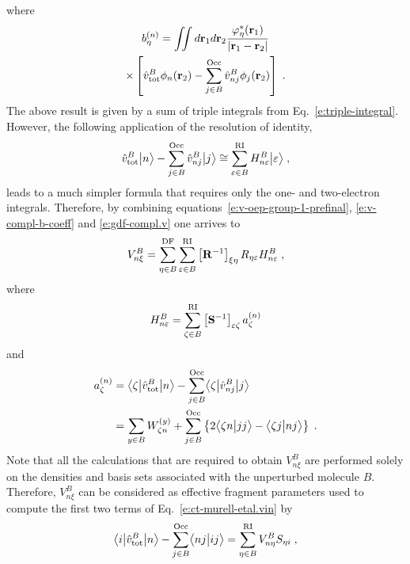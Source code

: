 %
where
%
\begin{multline}
 b^{(n)}_\eta = \iint 
           d{\bf r}_1 d{\bf r}_2  
           \frac{ \varphi^*_\eta({\bf r}_1) }
            {\vert {\bf r}_1 - {\bf r}_2 \vert } \\ \times
          \left[ 
           \hat{v}^B_{\rm tot}  \phi_n({\bf r}_2) 
         - \sum_{j\in B}^{\rm Occ} \hat{v}^B_{nj} \phi_j({{\bf r}_2})
           \right]  \;.
\end{multline}
%
The above result is given by a sum of triple integrals from Eq.~\eqref{e:triple-integral}.
However, the following application of the resolution of identity,
%
\begin{equation}
 \hat{v}^B_{\rm tot} \Ket{n} - \sum_{j\in B}^{\rm Occ} \hat{v}^B_{nj} \Ket{j}
 \cong \sum_{\varepsilon\in B}^{\rm RI} H_{n\varepsilon}^B \Ket{\varepsilon} \;,
\end{equation}
%
leads to a much simpler formula
that requires only the one\hyp{} and two\hyp{}electron integrals. 
Therefore, by combining
equations~\eqref{e:v-oep-group-1-prefinal}, \eqref{e:v-compl-b-coeff} and \eqref{e:gdf-compl.v}
one arrives to
%
\begin{equation} \label{e:v-oep-group-1-final}
 V^B_{n\xi} = \sum_{\eta\in B}^{\rm DF} 
          \sum_{\varepsilon\in B}^{\rm RI}
         \left[ {\bf R}^{-1} \right]_{\xi\eta}
         R_{\eta \varepsilon} 
         H_{n\varepsilon}^B \;,
\end{equation}
%
where
%
\begin{equation} \label{e:v-oep-group-1-final:H-matrix}
 H_{n\varepsilon}^B = \sum_{\zeta\in B}^{\rm RI} \left[ {\bf S}^{-1} \right]_{\varepsilon\zeta}
   a_\zeta^{(n)}
\end{equation}
%
and
\begin{align} \label{e:v-oep-group-1-final:a-vector}
 a^{(n)}_\zeta &= \tBraKet{\zeta}{\hat{v}^B_{\rm tot}}{n}
      - \sum_{j\in B}^{\rm Occ} \tBraKet{\zeta}{\hat{v}^B_{nj}}{j} \nonumber \\
 &= \sum_{y\in B} W^{(y)}_{\zeta n} 
  + \sum_{j\in B}^{\rm Occ} 
  \left\{
   2\BraKet{\zeta n}{jj} - \BraKet{\zeta j}{nj} 
  \right\} \;.
\end{align}
%
Note that all the calculations that are required to obtain $V^B_{n\xi}$ are performed
solely on the densities and basis sets associated with the unperturbed molecule $B$.
Therefore, $V^B_{n\xi}$ can be considered as effective fragment parameters
used to compute the first two terms of Eq.~\eqref{e:ct-murell-etal.vin} by
%
\begin{equation} \label{e:ct.group-i.final}
        \tBraKet{i}{\hat{v}^B_{\rm tot} }{n} 
      - \sum_{j\in B}^{\rm Occ} \BraKet{nj}{ij} 
       = \sum_{\eta\in B}^{\rm RI} V^B_{n\eta} S_{\eta i} \;,
\end{equation}
